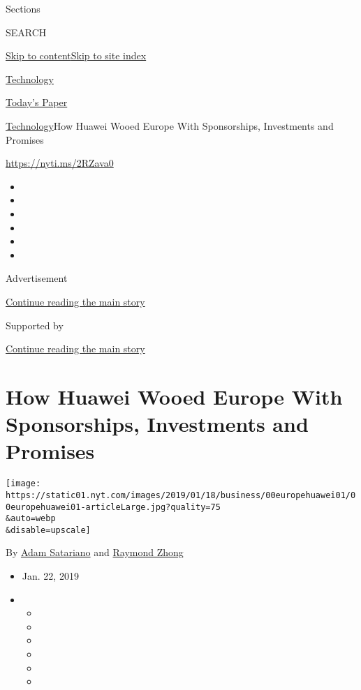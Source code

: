 Sections

SEARCH

\protect\hyperlink{site-content}{Skip to
content}\protect\hyperlink{site-index}{Skip to site index}

\href{https://www.nytimes.com/section/technology}{Technology}

\href{https://myaccount.nytimes.com/auth/login?response_type=cookie\&client_id=vi}{}

\href{https://www.nytimes.com/section/todayspaper}{Today's Paper}

\href{/section/technology}{Technology}\textbar{}How Huawei Wooed Europe
With Sponsorships, Investments and Promises

\url{https://nyti.ms/2RZava0}

\begin{itemize}
\item
\item
\item
\item
\item
\item
\end{itemize}

Advertisement

\protect\hyperlink{after-top}{Continue reading the main story}

Supported by

\protect\hyperlink{after-sponsor}{Continue reading the main story}

\hypertarget{how-huawei-wooed-europe-with-sponsorships-investments-and-promises}{%
\section{How Huawei Wooed Europe With Sponsorships, Investments and
Promises}\label{how-huawei-wooed-europe-with-sponsorships-investments-and-promises}}

\texttt{[image: https://static01.nyt.com/images/2019/01/18/business/00europehuawei01/00europehuawei01-articleLarge.jpg?quality=75\\\&auto=webp\\\&disable=upscale]}

By \href{https://www.nytimes.com/by/adam-satariano}{Adam Satariano} and
\href{https://www.nytimes.com/by/raymond-zhong}{Raymond Zhong}

\begin{itemize}
\item
  Jan. 22, 2019
\item
  \begin{itemize}
  \item
  \item
  \item
  \item
  \item
  \item
  \end{itemize}
\end{itemize}

